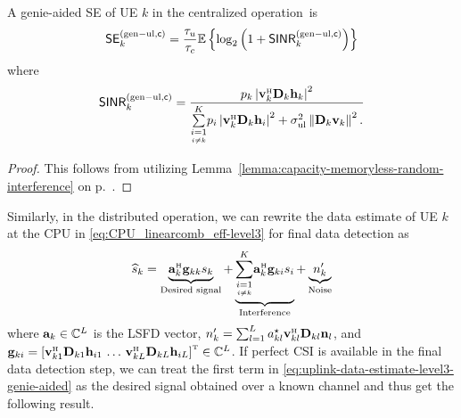 \begin{corollary} \label{corollary-genie-aided-level4}
	A genie-aided SE of UE $k$ in the centralized operation~is
	\begin{equation} \label{eq:genie-aided-uplink-SE-level4}
	\mathsf{SE}_{k}^{({\rm gen-ul},\mathsf{c})} = \frac{\tau_u}{\tau_c} \mathbb{E} \left\{ \log_2  \left( 1 + \mathsf{SINR}_{k}^{({\rm gen-ul},\mathsf{c})}  \right) \right\}
	\end{equation}
where
	\begin{equation} \label{eq:uplink-instant-SINR-genie-aided-level4}
	\mathacr{SINR}_{k}^{({\rm gen-ul},\cent)} = \frac{ p_{k} \left |  \vect{v}_{k}^{\Htran} \vect{D}_{k}\vect{h}_{k} \right|^2  }{ 
		\condSum{i=1}{i \neq k}{K} p_{i} \left | \vect{v}_{k}^{\Htran} \vect{D}_{k}\vect{h}_{i} \right|^2
		+ \sigmaUL\left \Vert \vect{D}_k \vect{v}_{k}\right\Vert^2  .
	}
	\end{equation}
\end{corollary}
\begin{proof}
This follows from utilizing Lemma~\ref{lemma:capacity-memoryless-random-interference} on p.~\pageref{lemma:capacity-memoryless-random-interference}.
\end{proof}


 Similarly, in the distributed operation, we can rewrite the data estimate of UE $k$ at the CPU in \eqref{eq:CPU_linearcomb_eff-level3} for final data detection as
\begin{align} 
\widehat{s}_k =\underbrace{\vect{a}_{k}^{\Htran}\vect{g}_{kk} s_k}_{\textrm{Desired signal}} + \underbrace{\condSum{i=1}{i \neq k}{K}\vect{a}_{k}^{\Htran}\vect{g}_{ki}  s_i}_{\textrm{Interference}} + \underbrace{n^\prime_{k}}_{\textrm{Noise}} \label{eq:uplink-data-estimate-level3-genie-aided}
\end{align}
where $\mathbf{a}_{k}\in \mathbb{C}^L$ is the LSFD vector, $n^\prime_{k} = \sum_{l=1}^{L} a_{kl}^{\star} \vect{v}_{kl}^{\Htran}\vect{D}_{kl}\vect{n}_{l}$, and $\vect{g}_{ki} = \left[ \vect{v}_{k1}^{\Htran}\vect{D}_{k1} \vect{h}_{i1} \, \ldots \, \vect{v}_{kL}^{\Htran} \vect{D}_{kL} \vect{h}_{iL}\right]^{\Ttran} \in \mathbb{C}^L$. 
If perfect CSI is available in the final data detection step, we can treat the first term in \eqref{eq:uplink-data-estimate-level3-genie-aided} as the desired signal obtained over a known channel and thus get the following result.


